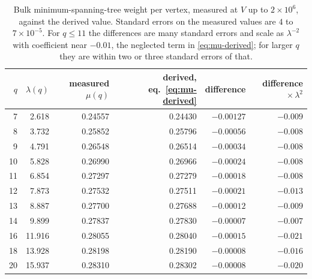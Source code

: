 \documentclass[11pt]{article}
\begin{document}
\begin{table}[htbp]
\centering
\begin{tabular}{rrrrrr}
\toprule
$q$ & $\lambda(q)$ & measured $\mu(q)$ & derived, eq.~\eqref{eq:mu-derived} & difference & difference$\,\times\lambda^2$ \\
\midrule
7 & 2.618 & 0.24557 & 0.24430 & $-0.00127$ & $-0.009$ \\
8 & 3.732 & 0.25852 & 0.25796 & $-0.00056$ & $-0.008$ \\
9 & 4.791 & 0.26548 & 0.26514 & $-0.00034$ & $-0.008$ \\
10 & 5.828 & 0.26990 & 0.26966 & $-0.00024$ & $-0.008$ \\
11 & 6.854 & 0.27297 & 0.27279 & $-0.00018$ & $-0.008$ \\
12 & 7.873 & 0.27532 & 0.27511 & $-0.00021$ & $-0.013$ \\
13 & 8.887 & 0.27700 & 0.27688 & $-0.00012$ & $-0.009$ \\
14 & 9.899 & 0.27837 & 0.27830 & $-0.00007$ & $-0.007$ \\
16 & 11.916 & 0.28055 & 0.28040 & $-0.00015$ & $-0.021$ \\
18 & 13.928 & 0.28198 & 0.28190 & $-0.00008$ & $-0.016$ \\
20 & 15.937 & 0.28310 & 0.28302 & $-0.00008$ & $-0.020$ \\
\bottomrule
\end{tabular}
\caption{Bulk minimum-spanning-tree weight per vertex, measured at $V$ up to $2\times10^6$, against the derived value. Standard errors on the measured values are $4$ to $7\times10^{-5}$. For $q\le11$ the differences are many standard errors and scale as $\lambda^{-2}$ with coefficient near $-0.01$, the neglected term in \eqref{eq:mu-derived}; for larger $q$ they are within two or three standard errors of that.}
\label{tab:mu}
\end{table}
\end{document}
